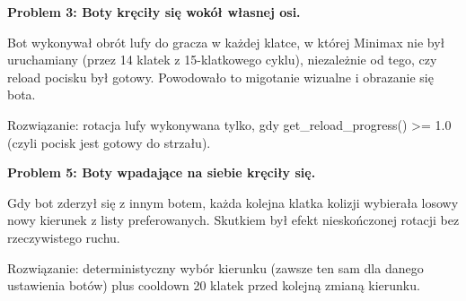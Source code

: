 \textbf{Problem 3: Boty kręciły się wokół własnej osi.} 

Bot wykonywał obrót lufy do gracza w każdej klatce, w której Minimax 
nie był uruchamiany (przez 14 klatek z 15-klatkowego cyklu), niezależnie od tego, czy reload pocisku był gotowy. 
Powodowało to migotanie wizualne i obrazanie się bota. 

Rozwiązanie: rotacja lufy wykonywana tylko, gdy get\_reload\_progress() >= 1.0 (czyli pocisk jest gotowy do strzału).
 
\textbf{Problem 5: Boty wpadające na siebie kręciły się.} 

Gdy bot zderzył się z innym botem, każda kolejna klatka kolizji wybierała losowy nowy kierunek z listy preferowanych. 
Skutkiem był efekt nieskończonej rotacji bez rzeczywistego ruchu. 

Rozwiązanie: deterministyczny wybór kierunku (zawsze ten sam dla danego ustawienia botów) plus cooldown 20 klatek 
przed kolejną zmianą kierunku.